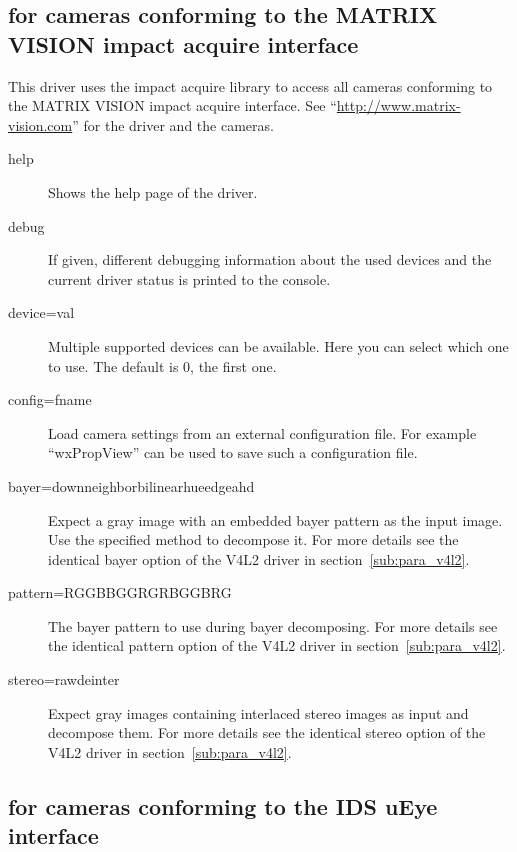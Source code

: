 \subsection { for cameras conforming to the
  MATRIX VISION impact acquire interface}

This driver uses the impact acquire library to access all cameras
conforming to the MATRIX VISION impact acquire interface. See
``\url{http://www.matrix-vision.com}'' for the driver and the
cameras.
\begin{description}
\item[help] Shows the help page of the driver.
\item[debug] If given, different debugging information about the
  used devices and the current driver status is printed to the
  console.
\item[device=val] Multiple supported devices can be available. Here
  you can select which one to use. The default is 0, the first one.
\item[config=fname] Load camera settings from an external
  configuration file. For example ``wxPropView'' can be used to save
  such a configuration file.
\item[bayer=down\textbar{}neighbor\textbar{}bilinear\textbar{}hue\textbar{}edge\textbar{}ahd]
  Expect a gray image with an embedded bayer pattern as the input
  image. Use the specified method to decompose it. For more details
  see the identical bayer option of the V4L2 driver in
  section~\ref{sub:para_v4l2}.
\item[pattern=RGGB\textbar{}BGGR\textbar{}GRBG\textbar{}GBRG]
  The bayer pattern to use during bayer decomposing. For more
  details see the identical pattern option of the V4L2 driver in
  section~\ref{sub:para_v4l2}.
\item[stereo=raw\textbar{}deinter] Expect gray images containing
  interlaced stereo images as input and decompose them. For more
  details see the identical stereo option of the V4L2 driver in
  section~\ref{sub:para_v4l2}.
\end{description}

\subsection { for cameras conforming to the IDS
  uEye interface}

